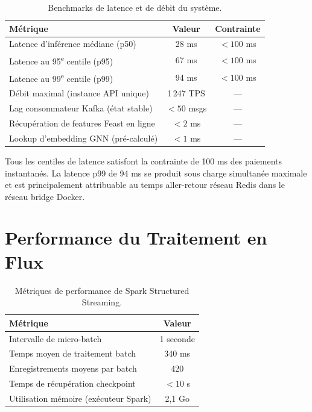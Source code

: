 \documentclass[12pt,a4paper,oneside]{book}
\theoremstyle{definition}
\theoremstyle{plain}
\begin{document}
\begin{table}[H]
  \centering
  \caption{Benchmarks de latence et de débit du système.}
  \label{tab:latency}
  \begin{tabular}{lcc}
    \toprule
    \textbf{Métrique} & \textbf{Valeur} & \textbf{Contrainte} \\
    \midrule
    Latence d'inférence médiane (p50)        & 28 ms    & $< 100$ ms \\
    Latence au 95\textsuperscript{e} centile (p95) & 67 ms & $< 100$ ms \\
    Latence au 99\textsuperscript{e} centile (p99) & 94 ms & $< 100$ ms \\
    Débit maximal (instance API unique)      & 1\,247 TPS & — \\
    Lag consommateur Kafka (état stable)     & $< 50$ msgs & — \\
    Récupération de features Feast en ligne  & $< 2$ ms   & — \\
    Lookup d'embedding GNN (pré-calculé)     & $< 1$ ms   & — \\
    \bottomrule
  \end{tabular}
\end{table}

Tous les centiles de latence satisfont la contrainte de 100 ms des paiements instantanés. La latence p99 de 94 ms se produit sous charge simultanée maximale et est principalement attribuable au temps aller-retour réseau Redis dans le réseau bridge Docker.

\section{Performance du Traitement en Flux}

\begin{table}[H]
  \centering
  \caption{Métriques de performance de Spark Structured Streaming.}
  \label{tab:streaming}
  \begin{tabular}{lc}
    \toprule
    \textbf{Métrique} & \textbf{Valeur} \\
    \midrule
    Intervalle de micro-batch         & 1 seconde \\
    Temps moyen de traitement batch   & 340 ms \\
    Enregistrements moyens par batch  & 420 \\
    Temps de récupération checkpoint  & $< 10$ s \\
    Utilisation mémoire (exécuteur Spark) & 2,1 Go \\
    \bottomrule
  \end{tabular}
\end{table}
\end{document}
